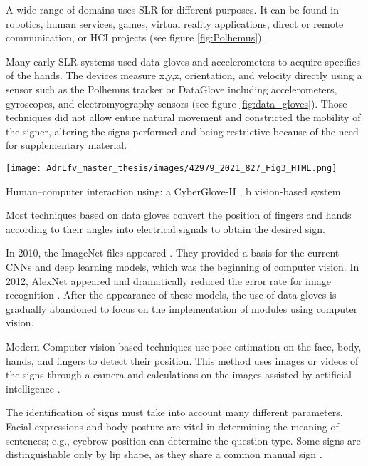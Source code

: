 A wide range of domains uses SLR for different purposes. It can be found in robotics, human services, games, virtual reality applications, direct or remote communication, or HCI projects \cite{adeyanju2021machine} (see figure \ref{fig:Polhemus}).

Many early SLR systems used data gloves and accelerometers to acquire specifics of the hands. The devices measure x,y,z, orientation, and velocity directly using a sensor such as the Polhemus tracker \cite{413199} \cite{5738842} or DataGlove \cite{Kadous1970} \cite{Metaxas1970} including accelerometers, gyroscopes, and electromyography sensors  (see figure \ref{fig:data_gloves}). Those techniques did not allow entire natural movement and constricted the mobility of the signer, altering the signs performed and being restrictive because of the need for supplementary material.

\begin{marginfigure}
    \centering
    \texttt{[image: AdrLfv\_master\_thesis/images/42979\_2021\_827\_Fig3\_HTML.png]}
    \caption{Human–computer interaction using: a CyberGlove-II \cite{cyberglovesystems}, b vision-based system}
    \label{fig:data_gloves}
\end{marginfigure}

Most techniques based on data gloves convert the position of fingers and hands according to their angles into electrical signals to obtain the desired sign. 

In 2010, the ImageNet files appeared \cite{li2010crowdsourcing}. They provided a basis for the current CNNs and deep learning models, which was the beginning of computer vision. In 2012, AlexNet appeared and dramatically reduced the error rate for image recognition \cite{alom2018history}. After the appearance of these models, the use of data gloves is gradually abandoned to focus on the implementation of modules using computer vision.

Modern Computer vision-based techniques use pose estimation on the face, body, hands, and fingers to detect their position. This method uses images or videos of the signs through a camera and calculations on the images assisted by artificial intelligence \cite{adeyanju2021machine}. 

The identification of signs must take into account many different parameters. Facial expressions and body posture are vital in determining the meaning of sentences; e.g., eyebrow position can determine the question type. Some signs are distinguishable only by lip shape, as they share a common manual sign \cite{cooper2011sign}. 


